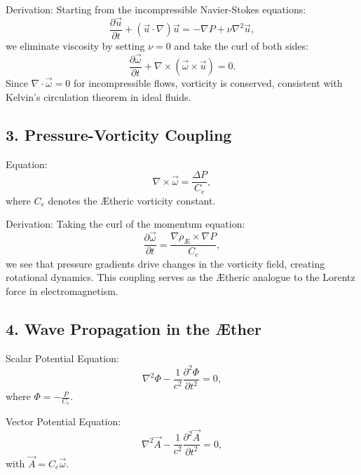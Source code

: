         Derivation:
        Starting from the incompressible Navier-Stokes equations:
        \begin{equation}
            \frac{\partial \vec{u}}{\partial t} + (\vec{u} \cdot \nabla) \vec{u} = -\nabla P + \nu \nabla^2 \vec{u},
        \end{equation}
        we eliminate viscosity by setting $\nu = 0$ and take the curl of both sides:
        \begin{equation}
            \frac{\partial \vec{\omega}}{\partial t} + \nabla \times (\vec{\omega} \times \vec{u}) = 0.
        \end{equation}
        Since $\nabla \cdot \vec{\omega} = 0$ for incompressible flows, vorticity is conserved, consistent with Kelvin's circulation theorem in ideal fluids.

        \subsection*{3. Pressure-Vorticity Coupling}
        Equation:
        \begin{equation}
            \nabla \times \vec{\omega} = \frac{\Delta P}{C_e},
        \end{equation}
        where $C_e$ denotes the Ætheric vorticity constant.

        Derivation:
        Taking the curl of the momentum equation:
        \begin{equation}
            \frac{\partial \vec{\omega}}{\partial t} = \frac{\nabla \rho_\text{Æ} \times \nabla P}{C_e},
        \end{equation}
        we see that pressure gradients drive changes in the vorticity field, creating rotational dynamics. This coupling serves as the Ætheric analogue to the Lorentz force in electromagnetism.

        \subsection*{4. Wave Propagation in the Æther}
        Scalar Potential Equation:
        \begin{equation}
            \nabla^2 \Phi - \frac{1}{c^2} \frac{\partial^2 \Phi}{\partial t^2} = 0,
        \end{equation}
        where $\Phi = -\frac{P}{C_e}$.

        Vector Potential Equation:
        \begin{equation}
            \nabla^2 \vec{A} - \frac{1}{c^2} \frac{\partial^2 \vec{A}}{\partial t^2} = 0,
        \end{equation}
        with $\vec{A} = C_e \vec{\omega}$.

